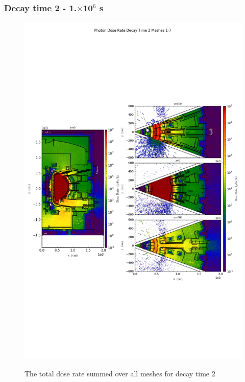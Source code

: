 \documentclass[12pt]{article}
\begin{document}
\subsubsection{Decay time 2 - 1.$\times$10$^6$ s}
\begin{figure}[ht!]
\centering
\includegraphics[trim={0cm 9cm 0cm 10cm},clip,scale=0.75]{../plots/final_model_nob4c/Photon_Dose_Rate_Decay_Time_2_Meshes_1-7.png}
\label{fig:photons_dc2_no4bc_total}
\caption{The total dose rate summed over all meshes for decay time 2}
\end{figure}
\end{document}
